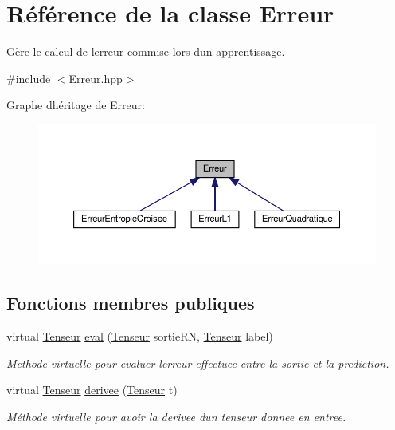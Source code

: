 \hypertarget{class_erreur}{}\section{Référence de la classe Erreur}
\label{class_erreur}


Gère le calcul de l\textquotesingle{}erreur commise lors d\textquotesingle{}un apprentissage.  




{\ttfamily \#include $<$Erreur.\+hpp$>$}



Graphe d\textquotesingle{}héritage de Erreur\+:\nopagebreak
\begin{figure}[H]
\begin{center}
\leavevmode
\includegraphics[width=350pt]{class_erreur__inherit__graph}
\end{center}
\end{figure}
\subsection*{Fonctions membres publiques}
\begin{DoxyCompactItemize}
\item 
virtual \hyperlink{class_tenseur}{Tenseur} \hyperlink{class_erreur_a0def45df23074388e2a338145aeb4660}{eval} (\hyperlink{class_tenseur}{Tenseur} sortie\+RN, \hyperlink{class_tenseur}{Tenseur} label)
\begin{DoxyCompactList}\small\item\em Methode virtuelle pour evaluer l\textquotesingle{}erreur effectuee entre la sortie et la prediction. \end{DoxyCompactList}\item 
virtual \hyperlink{class_tenseur}{Tenseur} \hyperlink{class_erreur_ad56634307e3ceb8ab5c2fddede28422a}{derivee} (\hyperlink{class_tenseur}{Tenseur} t)
\begin{DoxyCompactList}\small\item\em Méthode virtuelle pour avoir la derivee d\textquotesingle{}un tenseur donnee en entree. \end{DoxyCompactList}\end{DoxyCompactItemize}


